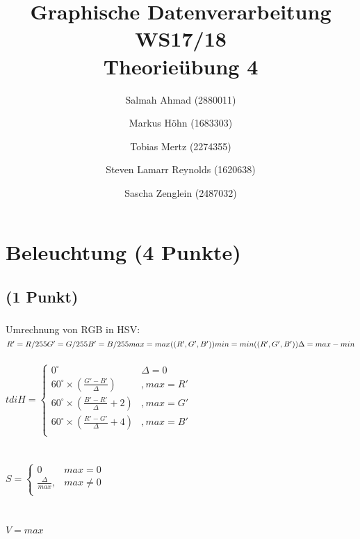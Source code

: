 \documentclass[a4paper,10pt,DIV=14]{article}
\begin{document}
\title{Graphische Datenverarbeitung WS17/18 \\ Theorieübung 4}
\author{
  Salmah Ahmad (2880011)
  \and
  Markus Höhn (1683303)
  \and
  Tobias Mertz (2274355)
  \and
  Steven Lamarr Reynolds (1620638)
  \and
  Sascha Zenglein (2487032)
}

\maketitle

\section{Beleuchtung (4 Punkte)}

\subsection{(1 Punkt)}

\subsubsection{}

Umrechnung von RGB in HSV: \\
\newline
$
R' = R/255\\
G' = G/255\\
B' = B/255\\
max = max((R', G', B'))\\
min = min((R', G', B'))\\
\Delta = max - min
$\\~\\
$t di
H = \begin{cases}
0^\circ &\Delta = 0\\
60^\circ \times (\frac{G'-B'}{\Delta}) &, max = R'\\
60^\circ \times (\frac{B'-R'}{\Delta}+2) &, max = G'\\
60^\circ \times (\frac{R'-G'}{\Delta}+4) &, max = B'\\
\end{cases}
$\\~\\~\\
$
S = \begin{cases}
0 & max = 0\\
\frac{\Delta}{max}, &max \neq 0\\
\end{cases}
$\\~\\~\\
$
V = max
$\\
\end{document}
